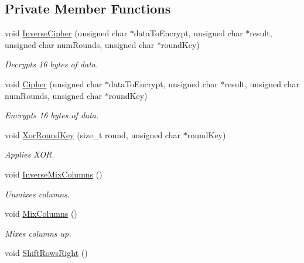 \subsection*{Private Member Functions}
\begin{DoxyCompactItemize}
\item 
void \hyperlink{class_thread_message_item_encrypt_a8e9f169278706177a7d1aa900935535f}{InverseCipher} (unsigned char $\ast$dataToEncrypt, unsigned char $\ast$result, unsigned char numRounds, unsigned char $\ast$roundKey)
\begin{DoxyCompactList}\small\item\em Decrypts 16 bytes of data. \item\end{DoxyCompactList}\item 
void \hyperlink{class_thread_message_item_encrypt_aabb242569b59c0d95e6f84f047e0ea3c}{Cipher} (unsigned char $\ast$dataToEncrypt, unsigned char $\ast$result, unsigned char numRounds, unsigned char $\ast$roundKey)
\begin{DoxyCompactList}\small\item\em Encrypts 16 bytes of data. \item\end{DoxyCompactList}\item 
void \hyperlink{class_thread_message_item_encrypt_a1c573e353ab806cd149056c4456a4a99}{XorRoundKey} (size\_\-t round, unsigned char $\ast$roundKey)
\begin{DoxyCompactList}\small\item\em Applies XOR. \item\end{DoxyCompactList}\item 
void \hyperlink{class_thread_message_item_encrypt_a5981d494cc033003edd92f43e4e1efe8}{InverseMixColumns} ()
\begin{DoxyCompactList}\small\item\em Unmixes columns. \item\end{DoxyCompactList}\item 
void \hyperlink{class_thread_message_item_encrypt_a37f4c99d84fe7ad1bc8ff97904ebebbd}{MixColumns} ()
\begin{DoxyCompactList}\small\item\em Mixes columns up. \item\end{DoxyCompactList}\item 
void \hyperlink{class_thread_message_item_encrypt_a5fd561501e4c55671a5ffba397b62009}{ShiftRowsRight} ()

\end{DoxyCompactItemize}
